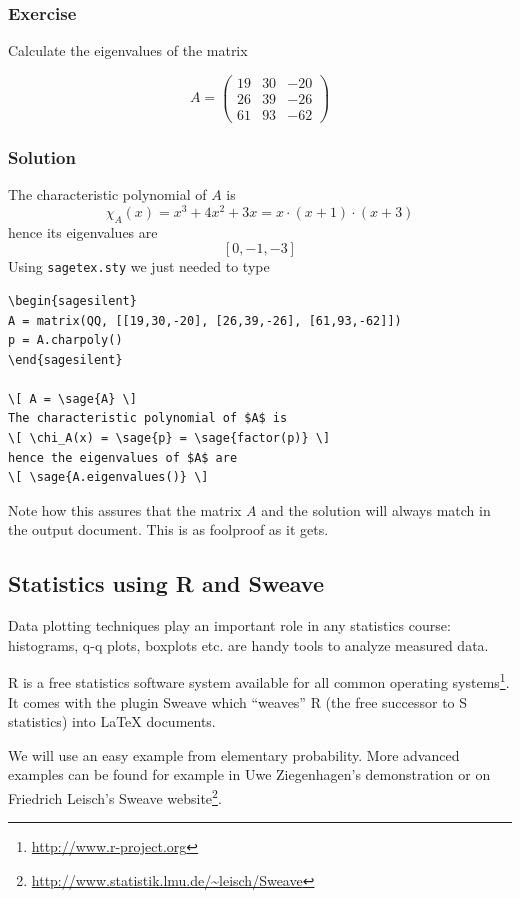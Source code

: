 \documentclass{maps}
\begin{document}
\subsubsection{Exercise} Calculate the eigenvalues of the matrix

\[ A = \left(\begin{array}{rrr}
19 & 30 & -20 \\
26 & 39 & -26 \\
61 & 93 & -62
\end{array}\right) \]

\subsubsection{Solution}

The characteristic polynomial of $A$ is
\[ \chi_A(x) = x^{3} + 4 x^{2} + 3 x = x \cdot (x + 1) \cdot (x + 3) \]
hence its eigenvalues are
\[ \left[0, -1, -3\right] \]
Using \texttt{sagetex.sty} we just needed to type
\begin{lstlisting}[language={[LaTeX]TeX}, style=arn:lst]
% 'sagesilent' returns no output
\begin{sagesilent}
A = matrix(QQ, [[19,30,-20], [26,39,-26], [61,93,-62]])
p = A.charpoly()
\end{sagesilent}

\[ A = \sage{A} \]
The characteristic polynomial of $A$ is
\[ \chi_A(x) = \sage{p} = \sage{factor(p)} \]
hence the eigenvalues of $A$ are
\[ \sage{A.eigenvalues()} \]
\end{lstlisting}

Note how this assures that the matrix $A$ and the solution will always match in the output document.
This is as foolproof as it gets.



\subsection{Statistics using R and Sweave}

Data plotting techniques play an important role in any statistics course: histograms, q-q plots, boxplots etc. are handy tools to analyze measured data.

R is a free statistics software system available for all common operating systems\footnote{\url{http://www.r-project.org}}. It comes with the plugin Sweave which \enquote{weaves} R (the free successor to S statistics) into \LaTeX{} documents.

We will use an easy example from elementary probability. More advanced examples can be found for example in Uwe Ziegenhagen's demonstration \cite{arn:ziegenhagen} or on Friedrich Leisch's Sweave website\footnote{\url{http://www.statistik.lmu.de/~leisch/Sweave}}.
\end{document}
